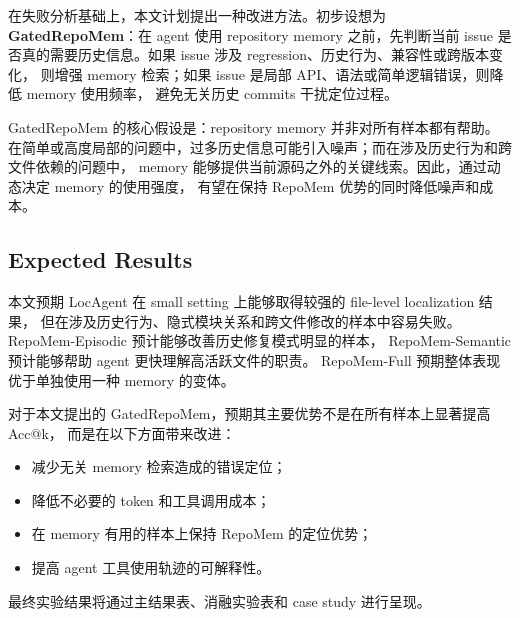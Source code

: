 \documentclass[11pt]{article}
\begin{document}
在失败分析基础上，本文计划提出一种改进方法。初步设想为
\textbf{GatedRepoMem}：在 agent 使用 repository memory 之前，先判断当前 issue
是否真的需要历史信息。如果 issue 涉及 regression、历史行为、兼容性或跨版本变化，
则增强 memory 检索；如果 issue 是局部 API、语法或简单逻辑错误，则降低 memory 使用频率，
避免无关历史 commits 干扰定位过程。

GatedRepoMem 的核心假设是：repository memory 并非对所有样本都有帮助。
在简单或高度局部的问题中，过多历史信息可能引入噪声；而在涉及历史行为和跨文件依赖的问题中，
memory 能够提供当前源码之外的关键线索。因此，通过动态决定 memory 的使用强度，
有望在保持 RepoMem 优势的同时降低噪声和成本。

\subsection{Expected Results}
\label{subsec:expected_results}

本文预期 LocAgent 在 small setting 上能够取得较强的 file-level localization 结果，
但在涉及历史行为、隐式模块关系和跨文件修改的样本中容易失败。
RepoMem-Episodic 预计能够改善历史修复模式明显的样本，
RepoMem-Semantic 预计能够帮助 agent 更快理解高活跃文件的职责。
RepoMem-Full 预期整体表现优于单独使用一种 memory 的变体。

对于本文提出的 GatedRepoMem，预期其主要优势不是在所有样本上显著提高 Acc@k，
而是在以下方面带来改进：

\begin{itemize}
    \item 减少无关 memory 检索造成的错误定位；
    \item 降低不必要的 token 和工具调用成本；
    \item 在 memory 有用的样本上保持 RepoMem 的定位优势；
    \item 提高 agent 工具使用轨迹的可解释性。
\end{itemize}

最终实验结果将通过主结果表、消融实验表和 case study 进行呈现。
\end{document}
